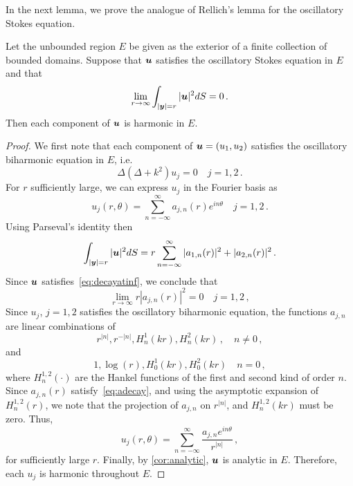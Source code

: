 In the next lemma, we prove the analogue of Rellich's lemma for the
oscillatory Stokes equation. 
\begin{lem}
  \label{lem:rellich}
    Let the unbounded region $E$ be given as the exterior
  of a finite collection of bounded domains.
  Suppose that ${\boldsymbol u}$ satisfies the oscillatory Stokes equation in
  $E$ and that 
\begin{equation}
\lim_{r \to \infty} \int_{|{\boldsymbol y}|=r} |{\boldsymbol u}|^2 dS = 0 
\, . \label{eq:decayatinf}
\end{equation}
Then each component of ${\boldsymbol u}$ is harmonic in $E$.
\end{lem}
\begin{proof}
We first note that each component of ${\boldsymbol u}= (u_{1},u_{2})$ satisfies the 
oscillatory biharmonic equation in $E$, i.e.
\begin{equation}
\Delta (\Delta + k^2) u_{j} = 0 \quad j=1,2 \,. \nonumber
\end{equation}
For $r$ sufficiently large, we can express $u_{j}$ in the Fourier basis as
\begin{equation}
u_{j}(r,\theta) = \sum_{n=-\infty}^{\infty} a_{j,n}(r) e^{i n \theta}  \quad 
j=1,2 \, . \nonumber
\end{equation}
Using Parseval's identity then
\begin{equation}
\int_{|{\boldsymbol y}|=r} |{\boldsymbol u}|^2 dS = r\sum_{n=-\infty}^{\infty} |a_{1,n}(r)|^2  +
|a_{2,n}(r)|^2 \, . \nonumber
\end{equation}
Since ${\boldsymbol u}$ satisfies~\cref{eq:decayatinf}, we conclude that
\begin{equation}
\lim_{r\to\infty} r|a_{j,n}(r)|^2 = 0 \quad j=1,2 \, , \label{eq:adecay}
\end{equation}
Since $u_{j}$, $j=1,2$ satisfies the oscillatory biharmonic equation,
the functions $a_{j,n}$ are linear combinations of 
\begin{equation}
r^{|n|}, r^{-|n|}, H^{1}_{n}(k r), H^{2}_{n}(k r) \, , \quad
n\neq 0 \, , \nonumber
\end{equation}
and
\begin{equation}
1, \log{(r)}, H^{1}_{0}(k r), H^{2}_{0}(k r) \quad n=0 \, ,  \nonumber
\end{equation} 
where $H_{n}^{1,2}(\cdot)$ are the Hankel functions of the first and
second kind of order $n$.
Since $a_{j,n}(r)$ satisfy~\cref{eq:adecay}, and using the asymptotic 
expansion of $H_{n}^{1,2}(r)$, we note that the projection of 
$a_{j,n}$ on $r^{|n|}$, and $H_{n}^{1,2}(k r)$ must be zero. 
Thus, 
\begin{equation}
u_{j}(r,\theta) = \sum_{n=-\infty}^{\infty} \frac{a_{j,n} e^{i n \theta}}{r^{|n|}} 
\, , \nonumber
\end{equation}
for sufficiently large $r$.
Finally, by \cref{cor:analytic}, ${\boldsymbol u}$ is
analytic in $E$. Therefore, each $u_j$ is harmonic
throughout $E$.
\end{proof}
